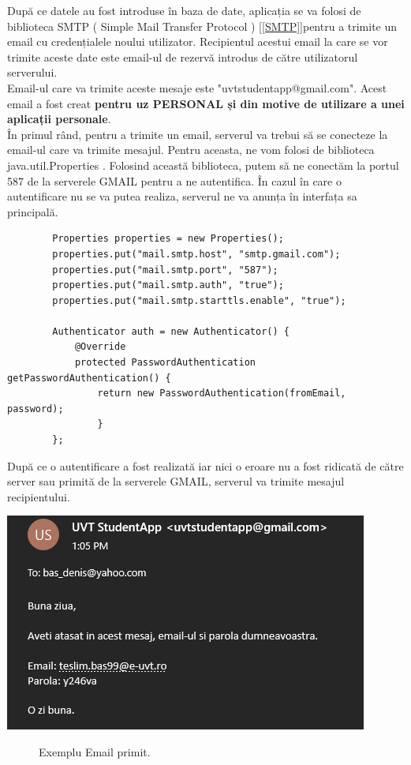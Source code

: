 \documentclass{article}
\begin{document}
		După ce datele au fost introduse în baza de date, aplicația se va folosi de biblioteca SMTP ( Simple Mail Transfer Protocol ) [\ref{SMTP}]pentru a trimite un email cu credențialele noului utilizator. Recipientul acestui email la care se vor trimite aceste date este email-ul de rezervă introdus de către utilizatorul serverului. \\
		  Email-ul care va trimite aceste mesaje este "uvtstudentapp@gmail.com". Acest email a fost creat \textbf{pentru uz PERSONAL și din motive de utilizare a unei aplicații personale}.\\
		În primul rând, pentru a trimite un email, serverul va trebui să se conecteze la email-ul care va trimite mesajul. Pentru aceasta, ne vom folosi de biblioteca java.util.Properties . Folosind această biblioteca, putem să ne conectăm la portul 587 de la serverele GMAIL pentru a ne autentifica. În cazul în care o autentificare nu se va putea realiza, serverul ne va anunța în interfața sa principală. \\
		
	\begin{verbatim}
        Properties properties = new Properties();
        properties.put("mail.smtp.host", "smtp.gmail.com");
        properties.put("mail.smtp.port", "587");
        properties.put("mail.smtp.auth", "true");
        properties.put("mail.smtp.starttls.enable", "true");

        Authenticator auth = new Authenticator() {
            @Override
            protected PasswordAuthentication getPasswordAuthentication() {
                return new PasswordAuthentication(fromEmail, password);
                }
        };

	\end{verbatim}
		
		  După ce o autentificare a fost realizată iar nici o eroare nu a fost ridicată de către server sau primită de la serverele GMAIL, serverul va trimite mesajul recipientului.

	\begin{center}
		\includegraphics[scale=0.8]{Source/ExempluMail}
		\begin{figure}[!h]
			{\caption*{Exemplu Email primit.}}
		\end{figure}
	\end{center}
\end{document}
